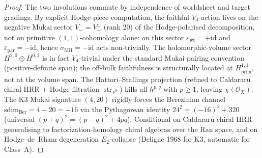 \begin{proof}
The two involutions commute by independence of worldsheet and target
gradings. By explicit Hodge-piece computation, the faithful
$V_4$-action lives on the negative Mukai sector
\(V_-=V_+^\perp\) \textup{(}rank $20$\textup{)} of the Hodge-polarised
decomposition, not on primitive \((1,1)\)-cohomology alone: on this
sector $\varepsilon_{\mathrm{wt}} = +\mathrm{id}$
and $\varepsilon_{\mathrm{par}} = -\mathrm{id}$, hence
$\sigma_{\mathrm{MH}} = -\mathrm{id}$ acts non-trivially. The
holomorphic-volume sector $H^{2,0} \oplus H^{0,2}$ is in fact
$V_4$-trivial under the standard Mukai pairing convention
\textup{(}positive-definite span\textup{);} the off-bulk faithfulness
is structurally located at $H^{1,1}_{\mathrm{prim}}$, not at the
volume span. The Hattori--Stallings
projection (refined to Caldararu chiral HRR + Hodge filtration
$\operatorname{str}_{F^0}$) kills all $h^{p, q}$ with $p \geq 1$,
leaving $\chi(\mathcal{O}_X)$. The K$3$ Mukai signature $(4, 20)$
rigidly forces the Berezinian channel
$\mathrm{sdim}_{\mathrm{Ber}} = 4 - 20 = -16$ via the Pythagorean
identity $24^2 = (-16)^2 + 320$
\textup{(}universal $(p+q)^2 = (p-q)^2 + 4pq$\textup{).} Conditional
on Caldararu chiral HRR generalising to factorization-homology chiral
algebras over the Ran space, and on Hodge--de~Rham degeneration
$E_2$-collapse \textup{(}Deligne 1968 for K$3$, automatic for
Class~A\textup{).}
\end{proof}

